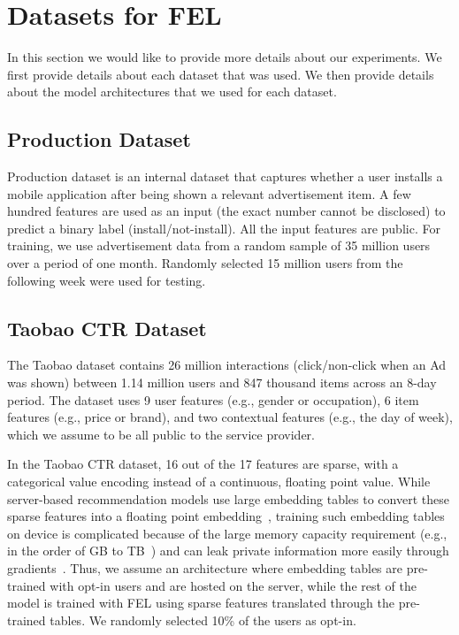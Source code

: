 \appendix

\section{Datasets for FEL}
\label{sec:datasets}
In this section we would like to provide more details about our experiments. We first provide details about each dataset that was used. We then provide details about the model architectures that we used for each dataset.  


\subsection{Production Dataset}
Production dataset is an internal dataset that captures whether a user installs a mobile application after being shown a relevant advertisement item. A few hundred features are used as an input (the exact number cannot be disclosed) to predict a binary label (install/not-install). All the input features are public. For training, we use advertisement data from a random sample of 35 million users over a period of one month. Randomly selected 15 million users from the following week were used for testing.  


\subsection{Taobao CTR Dataset}
The Taobao dataset contains 26 million interactions (click/non-click when an Ad was shown) between 1.14 million users and 847 thousand items across an 8-day period. 
The dataset uses 9 user features (e.g., gender or occupation), 6 item features (e.g., price or brand), and two contextual features (e.g., the day of week), which we assume to be all public to the service provider. 

In the Taobao CTR dataset, 16 out of the 17 features are sparse, with a categorical value encoding instead of a continuous, floating point value.
%
While server-based recommendation models use large embedding tables to convert these sparse features into a floating point embedding~\cite{din, dlrm, wideanddeep}, training such embedding tables on device is complicated because of the large memory capacity requirement (e.g., in the order of GB to TB~\cite{zhao2020distributed,acun:2021:understandingtraining,wilkening:2021:recssd,lui:2021:capacity}) and can leak private information more easily through gradients~\cite{alibaba_fl}. %
Thus, we assume an architecture where embedding tables are pre-trained with opt-in users and are hosted on the server, while the rest of the model is trained with FEL using sparse features translated through the pre-trained tables. We randomly selected 10\% of the users as opt-in.

